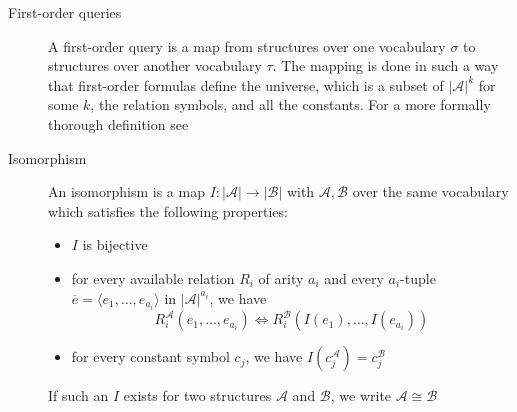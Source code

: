 \begin{description}
    \item[First-order queries] A first-order query is a map from structures over one vocabulary $\sigma$ to structures over another vocabulary $\tau$.
    The mapping is done in such a way that first-order formulas define the universe, which is a subset of $|\mathcal{A}|^k$ for some $k$, the relation symbols, and all the constants.
    For a more formally thorough definition see~\cite{descriptive-complexity}
    \item[Isomorphism] An isomorphism is a map $I: |\mathcal{A}| \to |\mathcal{B}|$ with $\mathcal{A}, \mathcal{B}$ over the same vocabulary which satisfies the following properties:
    \begin{itemize}
        \setlength\itemsep{0.15em}
        \item $I$ is bijective
        \item for every available relation $R_i$ of arity $a_i$ and every $a_i$-tuple $\overline{e} = \langle e_1, \dots, e_{a_i} \rangle$ in $|\mathcal{A}|^{a_i}$, we have \[R_i^{\mathcal{A}}(e_1, \dots, e_{a_i}) \Leftrightarrow R_i^{\mathcal{B}}(I(e_1), \dots, I(e_{a_i}))\]
        \item for every constant symbol $c_j$, we have $I(c_j^{\mathcal{A}}) = c_j^{\mathcal{B}}$
    \end{itemize}
    If such an $I$ exists for two structures $\mathcal{A}$ and $\mathcal{B}$, we write $\mathcal{A} \cong \mathcal{B}$
\end{description}


